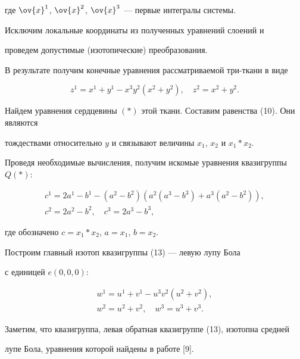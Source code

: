 где $\ov{x}^{1}$, $\ov{x}^{2}$, $\ov{x}^{3}$ --- первые интегралы системы.


Исключим локальные координаты из полученных уравнений слоений и


проведем допустимые (изотопические) преобразования.


В результате получим конечные уравнения рассматриваемой три-ткани в виде


$$


z^{1}=x^{1}+y^{1}-x^{3}y^{2}(x^{2}+y^{2}), \quad z^{2}=x^{2}+y^{2}.


$$


Найдем уравнения сердцевины $(*)$ этой ткани. Составим равенства (10). Они являются


тождествами относительно $y$ и связывают величины $x_1$, $x_2$ и $x_1*x_2$.


Проведя необходимые вычисления, получим искомые уравнения квазигруппы $Q(*)$:


\begin{equation}


\begin{array}{c}


c^{1}=2a^{1}-b^{1}-(a^{2}-b^{2})(a^{2}(a^{3}-b^{3})+a^{3}(a^{2}-b^{2})),\\[2mm]


c^{2}=2a^{2}-b^{2},\quad c^{3}=2a^{3}-b^{3},


\end{array}


\end{equation}


где обозначено $c=x_1*x_2$, $a=x_1$, $b=x_2$.


Построим главный изотоп квазигруппы (13) --- левую лупу Бола


с единицей $e(0,0,0)$:


\begin{gather*}


w^{1}=u^{1}+v^{1}-u^{3}v^{2}(u^{2}+v^{2}),\\


w^{2}=u^{2}+v^{2},\quad w^{3}=u^{3}+v^{3}.


\end{gather*}


Заметим, что квазигруппа, левая обратная квазигруппе (13), изотопна средней


лупе Бола, уравнения которой найдены в работе [9].








